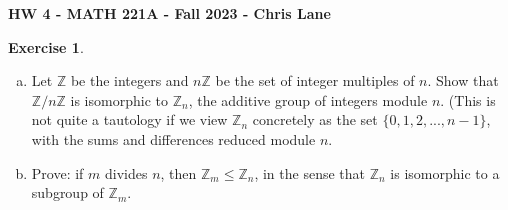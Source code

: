\documentclass[11pt,oneside]{article}
\numberwithin{equation}{section}
\theoremstyle{definition}
\newtheorem{exercise}{Exercise}
\def\ZZ{\mathbb{Z}}
\begin{document}
\textbf{HW 4 - MATH 221A - Fall 2023 - Chris Lane}

\begin{exercise}
  \begin{enumerate}[(a)]
  \item
    Let $\ZZ$ be the integers and $n\ZZ$ be the set of integer
    multiples of $n$.  Show that $\ZZ / n\ZZ$ is isomorphic to $\ZZ_n$,
    the additive group of integers module $n$.  (This is not quite a
    tautology if we view $\ZZ_n$ concretely as the set $\{0, 1, 2, ..., n-1\}$,
    with the sums and differences reduced module $n$.
  \item
     Prove: if $m$ divides $n$, then $\ZZ_m \leq \ZZ_n$, in the sense
     that $\ZZ_n$ is isomorphic to a subgroup of $\ZZ_m$.  
  \end{enumerate}
\end{exercise}
\end{document}
